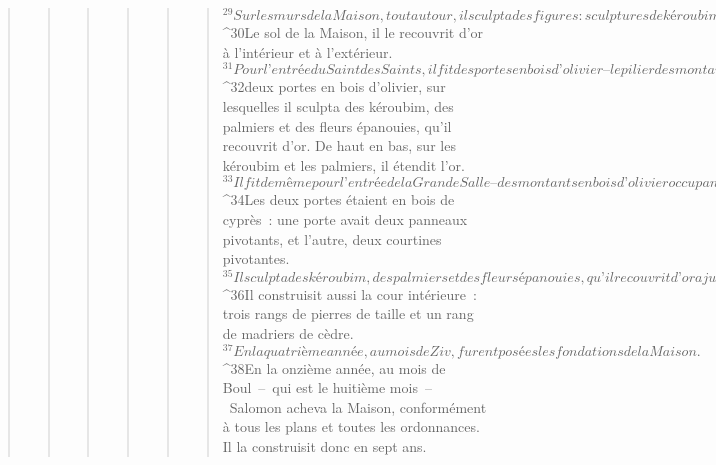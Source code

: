 \begin{verse}
\begin{verse}
\begin{verse}
\begin{verse}
\begin{verse}
\begin{verse}
${}^{29}Sur les murs de la Maison, tout autour, il sculpta des figures : sculptures de kéroubim, de palmiers et de fleurs épanouies, sur le devant et à l’extérieur. 
${}^{30}Le sol de la Maison, il le recouvrit d’or à l’intérieur et à l’extérieur. 
${}^{31}Pour l’entrée du Saint des Saints, il fit des portes en bois d’olivier – le pilier des montants avait cinq côtés –, 
${}^{32}deux portes en bois d’olivier, sur lesquelles il sculpta des kéroubim, des palmiers et des fleurs épanouies, qu’il recouvrit d’or. De haut en bas, sur les kéroubim et les palmiers, il étendit l’or. 
${}^{33}Il fit de même pour l’entrée de la Grande Salle – des montants en bois d’olivier occupant le quart de l’ensemble. 
${}^{34}Les deux portes étaient en bois de cyprès : une porte avait deux panneaux pivotants, et l’autre, deux courtines pivotantes. 
${}^{35}Il sculpta des kéroubim, des palmiers et des fleurs épanouies, qu’il recouvrit d’or ajusté sur ce qui était modelé. 
${}^{36}Il construisit aussi la cour intérieure : trois rangs de pierres de taille et un rang de madriers de cèdre.
${}^{37}En la quatrième année, au mois de Ziv, furent posées les fondations de la Maison. 
${}^{38}En la onzième année, au mois de Boul – qui est le huitième mois – Salomon acheva la Maison, conformément à tous les plans et toutes les ordonnances. Il la construisit donc en sept ans.
      

\end{verse}
\end{verse}
\end{verse}
\end{verse}
\end{verse}
\end{verse}
